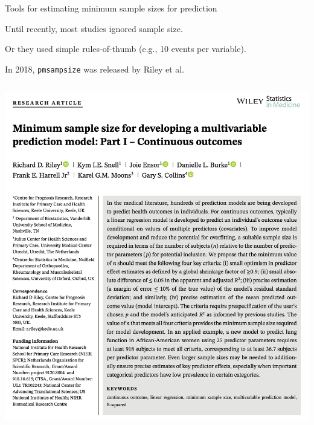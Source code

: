 \documentclass[11pt]{beamer}
\begin{document}
\begin{frame}[t]{Tools for estimating minimum sample sizes for prediction}

	Until recently, most studies ignored sample size.

	Or they used simple rules-of-thumb (e.g., 10 events per variable).

	In 2018, \texttt{pmsampsize} was released by Riley et al.

	\begin{columns}
		\begin{column}[c]{0.5\textwidth}
			\includegraphics[width=\textwidth]{figures/riley1.png}


\end{column}
\end{columns}
\end{frame}
\end{document}
